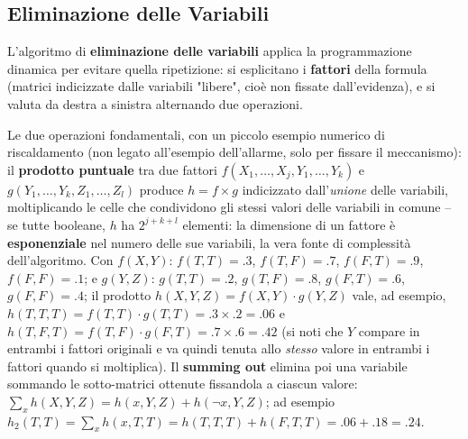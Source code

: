 \documentclass[a4paper,11pt]{article}
\begin{document}
\subsection{Eliminazione delle Variabili}

L'algoritmo di \textbf{eliminazione delle variabili} applica la programmazione dinamica per evitare quella ripetizione: si esplicitano i \textbf{fattori} della formula (matrici indicizzate dalle variabili "libere", cioè non fissate dall'evidenza), e si valuta da destra a sinistra alternando due operazioni.

Le due operazioni fondamentali, con un piccolo esempio numerico di riscaldamento (non legato all'esempio dell'allarme, solo per fissare il meccanismo): il \textbf{prodotto puntuale} tra due fattori $f(X_1,\ldots,X_j,Y_1,\ldots,Y_k)$ e $g(Y_1,\ldots,Y_k,Z_1,\ldots,Z_l)$ produce $h=f\times g$ indicizzato dall'\emph{unione} delle variabili, moltiplicando le celle che condividono gli stessi valori delle variabili in comune -- se tutte booleane, $h$ ha $2^{j+k+l}$ elementi: la dimensione di un fattore è \textbf{esponenziale} nel numero delle sue variabili, la vera fonte di complessità dell'algoritmo. Con $f(X,Y)$: $f(T,T){=}.3$, $f(T,F){=}.7$, $f(F,T){=}.9$, $f(F,F){=}.1$; e $g(Y,Z)$: $g(T,T){=}.2$, $g(T,F){=}.8$, $g(F,T){=}.6$, $g(F,F){=}.4$; il prodotto $h(X,Y,Z)=f(X,Y)\cdot g(Y,Z)$ vale, ad esempio, $h(T,T,T)=f(T,T)\cdot g(T,T)=.3\times.2=.06$ e $h(T,F,T)=f(T,F)\cdot g(F,T)=.7\times.6=.42$ (si noti che $Y$ compare in entrambi i fattori originali e va quindi tenuta allo \emph{stesso} valore in entrambi i fattori quando si moltiplica). Il \textbf{summing out} elimina poi una variabile sommando le sotto-matrici ottenute fissandola a ciascun valore: $\sum_x h(X,Y,Z)=h(x,Y,Z)+h(\neg x,Y,Z)$; ad esempio $h_2(T,T)=\sum_x h(x,T,T)=h(T,T,T)+h(F,T,T)=.06+.18=.24$.
\end{document}
